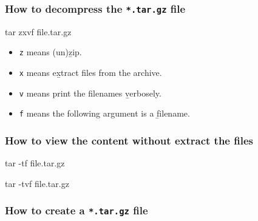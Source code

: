 \documentclass[]{book}
\makeatletter
\newenvironment{Shaded}{\begin{snugshade}}{\end{snugshade}}
\newcommand{\FunctionTok}[1]{\textcolor[rgb]{0.00,0.00,0.00}{#1}}
\newcommand{\NormalTok}[1]{#1}
\providecommand{\tightlist}{%
  \setlength{\itemsep}{0pt}\setlength{\parskip}{0pt}}
\newenvironment{kframe}{%
\medskip{}
\setlength{\fboxsep}{.8em}
 \def\at@end@of@kframe{}%
 \ifinner\ifhmode%
  \def\at@end@of@kframe{\end{minipage}}%
  \begin{minipage}{\columnwidth}%
 \fi\fi%
 \def\FrameCommand##1{\hskip\@totalleftmargin \hskip-\fboxsep
 \colorbox{shadecolor}{##1}\hskip-\fboxsep
     \hskip-\linewidth \hskip-\@totalleftmargin \hskip\columnwidth}%
 \MakeFramed {\advance\hsize-\width
   \@totalleftmargin\z@ \linewidth\hsize
   \@setminipage}}%
 {\par\unskip\endMakeFramed%
 \at@end@of@kframe}
\renewenvironment{Shaded}{\begin{kframe}}{\end{kframe}}
\makeatother
\begin{document}
\hypertarget{how-to-decompress-the-.tar.gz-file}{%
\subsubsection{\texorpdfstring{How to decompress the \texttt{*.tar.gz} file}{How to decompress the *.tar.gz file}}\label{how-to-decompress-the-.tar.gz-file}}

\begin{Shaded}
\begin{Highlighting}[]
\FunctionTok{tar}\NormalTok{ zxvf file.tar.gz}
\end{Highlighting}
\end{Shaded}

\begin{itemize}
\tightlist
\item
  \texttt{z} means (un)z̲ip.
\item
  \texttt{x} means ex̲tract files from the archive.
\item
  \texttt{v} means print the filenames v̲erbosely.
\item
  \texttt{f} means the following argument is a f̱ilename.
\end{itemize}

\hypertarget{how-to-view-the-content-without-extract-the-files}{%
\subsubsection{How to view the content without extract the files}\label{how-to-view-the-content-without-extract-the-files}}

\begin{Shaded}
\begin{Highlighting}[]
\FunctionTok{tar}\NormalTok{ -tf file.tar.gz}
\end{Highlighting}
\end{Shaded}

\begin{Shaded}
\begin{Highlighting}[]
\FunctionTok{tar}\NormalTok{ -tvf file.tar.gz}
\end{Highlighting}
\end{Shaded}

\hypertarget{how-to-create-a-.tar.gz-file}{%
\subsubsection{\texorpdfstring{How to create a \texttt{*.tar.gz} file}{How to create a *.tar.gz file}}\label{how-to-create-a-.tar.gz-file}}
\end{document}
